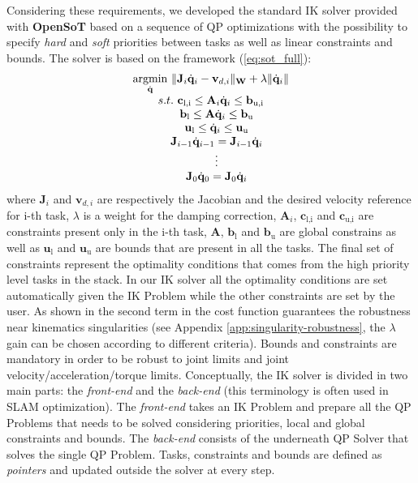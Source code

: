 Considering these requirements, we developed the standard IK solver provided with \textbf{OpenSoT} based on a sequence of QP optimizations with the possibility to specify \emph{hard} and \emph{soft} priorities between tasks as well as linear constraints and bounds. 
The solver is based on the framework (\ref{eq:sot_full}):
\begin{equation} 
\label{optimization_problem2}
\begin{array}{c}
\underset{\dot{\mathbf{q}}}{\operatorname{argmin}} \ \Arrowvert \mathbf{J}_i \dot{\mathbf{q}}_i-\mathbf{v}_{d,i} \Arrowvert_{\mathbf{W}} + \lambda \Arrowvert \dot{\mathbf{q}}_i \Arrowvert\\
s.t. \ \mathbf{c}_\text{l,i} \leq \mathbf{A}_i\dot{\mathbf{q}}_i \leq \mathbf{b}_\text{u,i}\\
\ \ \ \mathbf{b}_\text{l} \leq \mathbf{A}\dot{\mathbf{q}}_i \leq \mathbf{b}_\text{u}\\
\ \ \ \mathbf{u}_\text{l} \leq \dot{\mathbf{q}}_i \leq \mathbf{u}_\text{u}\\
\ \ \ \mathbf{J}_{i-1}\dot{\mathbf{q}}_{i-1} = \mathbf{J}_{i-1}\dot{\mathbf{q}}_i\\
\ \ \ \vdots \\
\ \ \ \mathbf{J}_{0}\dot{\mathbf{q}}_{0} = \mathbf{J}_{0}\dot{\mathbf{q}}_i
\end{array}
\end{equation}
where $\mathbf{J}_i$ and $\mathbf{v}_{d,i}$ are respectively the Jacobian and the desired velocity reference for i-th task, $\lambda$ is a weight for the damping correction, $\mathbf{A}_i$, $\mathbf{c}_\text{l,i}$ and $\mathbf{c}_\text{u,i}$ are constraints present only in the i-th task, $\mathbf{A}$, $\mathbf{b}_\text{l}$ and $\mathbf{b}_\text{u}$ are global constrains as well as $\mathbf{u}_\text{l}$ and $\mathbf{u}_\text{u}$ are bounds that are present in all the tasks. 
The final set of constraints represent the optimality conditions that comes from the high priority level tasks in the stack. In our IK solver all the optimality conditions are set automatically given the IK Problem while the other constraints are set by the user.
As shown in \cite{nakamura1990-tp} the second term in the cost function guarantees the robustness near kinematics singularities (see Appendix \ref{app:singularity-robustness}, the $\lambda$ gain can be chosen according to different criteria). Bounds and constraints are mandatory in order to be robust to joint limits and joint velocity/acceleration/torque limits.
Conceptually, the IK solver is divided in two main parts: the \emph{front-end} and the \emph{back-end} (this terminology is often used in SLAM optimization).
The \emph{front-end} takes an IK Problem and prepare all the QP Problems that needs to be solved considering priorities, local and global constraints and bounds. The \emph{back-end} consists of the underneath QP Solver that solves the single QP Problem. Tasks, constraints and bounds are defined as \emph{pointers} and updated outside the solver at every step.

